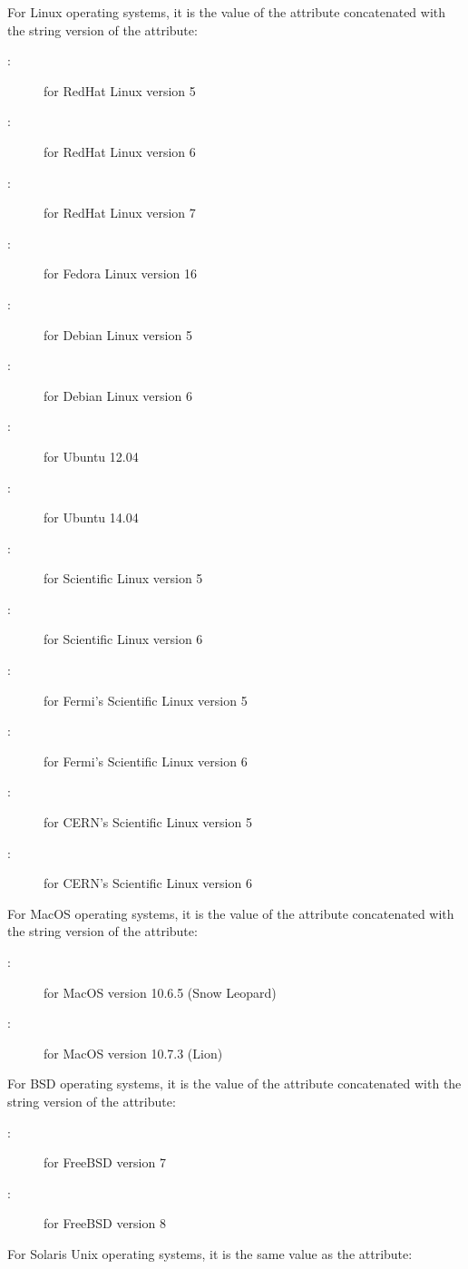 \begin{description}
For Linux operating systems, it is the value of the  attribute 
concatenated with the string version of the  attribute:
	\begin{description}
	\item[:] for RedHat Linux version 5
	\item[:] for RedHat Linux version 6
	\item[:] for RedHat Linux version 7
	\item[:] for Fedora Linux version 16
	\item[:] for Debian Linux version 5
	\item[:] for Debian Linux version 6
	\item[:] for Ubuntu 12.04
	\item[:] for Ubuntu 14.04
	\item[:] for Scientific Linux version 5
	\item[:] for Scientific Linux version 6
	\item[:] for Fermi's Scientific Linux version 5
	\item[:] for Fermi's Scientific Linux version 6
	\item[:] for CERN's Scientific Linux version 5
	\item[:] for CERN's Scientific Linux version 6
	\end{description}
For MacOS operating systems, it is the value of the  
attribute concatenated with the string version of the  attribute: 
	\begin{description}
	\item[:] for MacOS version 10.6.5 (Snow Leopard)
	\item[:] for MacOS version 10.7.3 (Lion)
	\end{description}
For BSD operating systems, it is the value of the  attribute 
concatenated with the string version of the  attribute:
	\begin{description}
	\item[:] for FreeBSD version 7
	\item[:] for FreeBSD version 8
	\end{description}
For Solaris Unix operating systems, 
it is the same value as the  attribute: 

\end{description}
